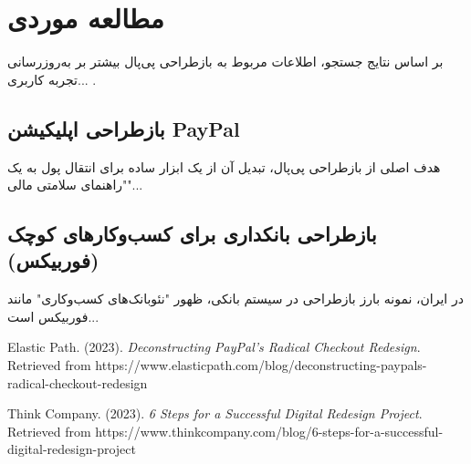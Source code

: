 \section{مطالعه موردی}
\label{section:4-7}

بر اساس نتایج جستجو، اطلاعات مربوط به بازطراحی پی‌پال بیشتر بر به‌روزرسانی تجربه کاربری... \cite{elasticpath-paypal}.

\subsection{بازطراحی اپلیکیشن PayPal}
هدف اصلی از بازطراحی پی‌پال، تبدیل آن از یک ابزار ساده برای انتقال پول به یک "راهنمای سلامتی مالی"...

\subsection{بازطراحی بانکداری برای کسب‌وکارهای کوچک (فوربیکس)}
در ایران، نمونه بارز بازطراحی در سیستم بانکی، ظهور "نئوبانک‌های کسب‌وکاری" مانند فوربیکس است...

\begin{thebibliography}{9}
Elastic Path. (2023). \textit{Deconstructing PayPal's Radical Checkout Redesign}. Retrieved from https://www.elasticpath.com/blog/deconstructing-paypals-radical-checkout-redesign

Think Company. (2023). \textit{6 Steps for a Successful Digital Redesign Project}. Retrieved from https://www.thinkcompany.com/blog/6-steps-for-a-successful-digital-redesign-project
\end{thebibliography}
